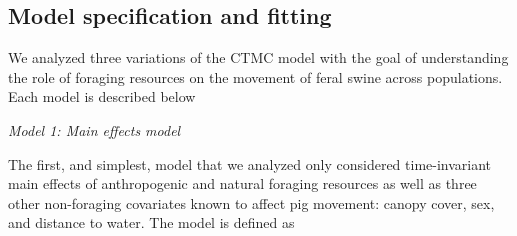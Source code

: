 \documentclass[a4paper]{article}
\begin{document}
\subsection*{Model specification and fitting}

We analyzed three variations of the CTMC model with the goal of understanding the role of foraging resources on the movement of feral swine across populations.  Each model is described below

\bigskip
\noindent
\emph{Model 1: Main effects model}

The first, and simplest, model that we analyzed only considered time-invariant main effects of anthropogenic and natural foraging resources as well as three other non-foraging covariates known to affect pig movement: canopy cover, sex, and distance to water.  The model is defined as
\end{document}
